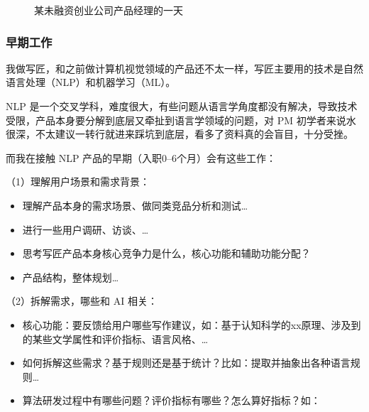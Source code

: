 \documentclass[letterpaper,11pt,english]{sphinxmanual}
\begin{document}
\begin{figure}[H]
\centering
\capstart

\noindent{}
\caption{某未融资创业公司产品经理的一天}\label{\detokenize{chapter_experience/1Day:id11}}\end{figure}


\subsubsection{早期工作}
\label{\detokenize{chapter_experience/early_phase:id1}}\label{\detokenize{chapter_experience/early_phase::doc}}
我做写匠，和之前做计算机视觉领域的产品还不太一样，写匠主要用的技术是自然语言处理（NLP）和机器学习（ML）。%
\begin{footnote}[617]\sphinxAtStartFootnote
{}
%
\end{footnote}
NLP
是一个交叉学科，难度很大，有些问题从语言学角度都没有解决，导致技术受限，产品本身要分解到底层又牵扯到语言学领域的问题，对
PM
初学者来说水很深，不太建议一转行就进来踩坑到底层，看多了资料真的会盲目，十分受挫。

而我在接触 NLP 产品的早期（入职0–6个月）会有这些工作：

（1）理解用户场景和需求背景：
\begin{itemize}
\item {} 
理解产品本身的需求场景、做同类竞品分析和测试…

\item {} 
进行一些用户调研、访谈、…

\item {} 
思考写匠产品本身核心竞争力是什么，核心功能和辅助功能分配？

\item {} 
产品结构，整体规划…

\end{itemize}

（2）拆解需求，哪些和 AI 相关：
\begin{itemize}
\item {} 
核心功能：要反馈给用户哪些写作建议，如：基于认知科学的xx原理、涉及到的某些文学属性和评价指标、语言风格、…

\item {} 
如何拆解这些需求？基于规则还是基于统计？比如：提取并抽象出各种语言规则…

\item {} 
算法研发过程中有哪些问题？评价指标有哪些？怎么算好指标？如：

\end{itemize}
\end{document}
